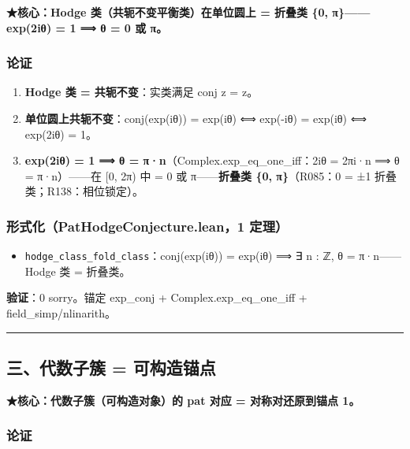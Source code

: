 \documentclass[
]{article}
\providecommand{\tightlist}{%
  \setlength{\itemsep}{0pt}\setlength{\parskip}{0pt}}
\begin{document}
\textbf{★核心：Hodge 类（共轭不变平衡类）在单位圆上 = 折叠类 \{0,
π\}------exp(2iθ) = 1 ⟹ θ = 0 或 π。}

\subsubsection{论证}\label{ux8bbaux8bc1-1}

\begin{enumerate}
\def\labelenumi{\arabic{enumi}.}
\tightlist
\item
  \textbf{Hodge 类 = 共轭不变}：实类满足 conj z = z。
\item
  \textbf{单位圆上共轭不变}：conj(exp(iθ)) = exp(iθ) ⟺ exp(-iθ) =
  exp(iθ) ⟺ exp(2iθ) = 1。
\item
  \textbf{exp(2iθ) = 1 ⟹ θ = π·n}（Complex.exp\_eq\_one\_iff：2iθ =
  2πi·n ⟹ θ = π·n）------在 {[}0, 2π) 中 = 0 或 π------\textbf{折叠类
  \{0, π\}}（R085：0 = ±1 折叠类；R138：相位锁定）。
\end{enumerate}

\subsubsection{形式化（PatHodgeConjecture.lean，1
定理）}\label{ux5f62ux5f0fux5316pathodgeconjecture.lean1-ux5b9aux7406-1}

\begin{itemize}
\tightlist
\item
  \texttt{hodge\_class\_fold\_class}：conj(exp(iθ)) = exp(iθ) ⟹ ∃ n : ℤ,
  θ = π·n------Hodge 类 = 折叠类。
\end{itemize}

\textbf{验证}：0 sorry。锚定 exp\_conj + Complex.exp\_eq\_one\_iff +
field\_simp/nlinarith。

\begin{center}\rule{0.5\linewidth}{0.5pt}\end{center}

\subsection{三、代数子簇 =
可构造锚点}\label{ux4e09ux4ee3ux6570ux5b50ux7c07-ux53efux6784ux9020ux951aux70b9}

\textbf{★核心：代数子簇（可构造对象）的 pat 对应 = 对称对还原到锚点 1。}

\subsubsection{论证}\label{ux8bbaux8bc1-2}
\end{document}

